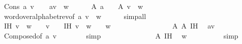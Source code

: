 \begin{isabellebody}
\ {\isacharparenleft}{\kern0pt}Cons\ a\ v{\isacharparenright}{\kern0pt}\isanewline
\ \ \isamarkupfalse%
\ {\isachardoublequoteopen}a{\isacharhash}{\kern0pt}v\ {\isasymsqdot}\ w\ {\isasymin}\ {\isasymSigma}\isactrlsup {\isacharasterisk}{\kern0pt}{\isachardoublequoteclose}\isanewline
\ \ \isamarkupfalse%
\ A{}{\isacharcolon}{\kern0pt}\ {\isachardoublequoteopen}a\ {\isasymin}\ {\isasymSigma}{\isachardoublequoteclose}\ \ A{}{\isacharcolon}{\kern0pt}\ {\isachardoublequoteopen}v\ {\isasymsqdot}\ w\ {\isasymin}\ {\isasymSigma}\isactrlsup {\isacharasterisk}{\kern0pt}{\isachardoublequoteclose}\isanewline
\ \ \ \ \isamarkupfalse%
\ word{\isacharunderscore}{\kern0pt}over{\isacharunderscore}{\kern0pt}alphabet{\isacharunderscore}{\kern0pt}rev{\isacharbrackleft}{\kern0pt}of\ a\ {\isachardoublequoteopen}v\ {\isasymsqdot}\ w{\isachardoublequoteclose}{\isacharbrackright}{\kern0pt}\isanewline
\ \ \ \ \isamarkupfalse%
\ simp{\isacharunderscore}{\kern0pt}all\isanewline
\ \ \isamarkupfalse%
\ IH{}{\isacharcolon}{\kern0pt}\ {\isachardoublequoteopen}v\ {\isasymsqdot}\ w\ {\isasymin}\ {\isasymSigma}\isactrlsup {\isacharasterisk}{\kern0pt}\ {\isasymLongrightarrow}\ v\ {\isasymin}\ {\isasymSigma}\isactrlsup {\isacharasterisk}{\kern0pt}{\isachardoublequoteclose}\ \ IH{}{\isacharcolon}{\kern0pt}\ {\isachardoublequoteopen}v\ {\isasymsqdot}\ w\ {\isasymin}\ {\isasymSigma}\isactrlsup {\isacharasterisk}{\kern0pt}\ {\isasymLongrightarrow}\ w\ {\isasymin}\ {\isasymSigma}\isactrlsup {\isacharasterisk}{\kern0pt}{\isachardoublequoteclose}\isanewline
\ \ \isakeywordONE{{\isacharbraceleft}{\kern0pt}}\isamarkupfalse%
\isanewline
\ \ \ \ \isamarkupfalse%
\ {}\isanewline
\ \ \ \ \isamarkupfalse%
\ A{}\ A{}\ IH{}\ \isamarkupfalse%
\ {\isachardoublequoteopen}a{\isacharhash}{\kern0pt}v\ {\isasymin}\ {\isasymSigma}\isactrlsup {\isacharasterisk}{\kern0pt}{\isachardoublequoteclose}\isanewline
\ \ \ \ \ \ \isamarkupfalse%
\ Composed{\isacharbrackleft}{\kern0pt}of\ a\ v{\isacharbrackright}{\kern0pt}\isanewline
\ \ \ \ \ \ \isamarkupfalse%
\ simp\isanewline
\ \ \isamarkupfalse%
\isanewline
\ \ \ \ \isamarkupfalse%
\ {}\isanewline
\ \ \ \ \isamarkupfalse%
\ A{}\ IH{}\ \isamarkupfalse%
\ {\isachardoublequoteopen}w\ {\isasymin}\ {\isasymSigma}\isactrlsup {\isacharasterisk}{\kern0pt}{\isachardoublequoteclose}\isanewline
\ \ \ \ \ \ \isamarkupfalse%
\ simp\isanewline
\ \ \isakeywordONE{{\isacharbraceright}{\kern0pt}}\isamarkupfalse%
\isanewline
{}\isamarkupfalse%
%
\endisatagproof
{\isafoldproof}%
%
\isadelimproof
\isanewline
%
\endisadelimproof
\isanewline
{}\isamarkupfalse%
\isanewline
%
\isadelimtheory
\isanewline
%
\endisadelimtheory
%
\isatagtheory
{}\isamarkupfalse%
%
\endisatagtheory
{\isafoldtheory}%
%
\isadelimtheory
%
\endisadelimtheory
%
\end{isabellebody}%
